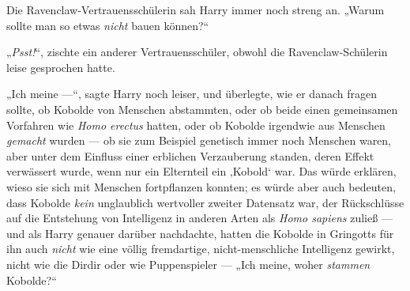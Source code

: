 Die Ravenclaw-Vertrauensschülerin sah Harry immer noch streng an.
„Warum sollte man so etwas \emph{nicht} bauen können?“

„\emph{Psst!}“, zischte ein anderer Vertrauensschüler, obwohl die Ravenclaw-Schülerin leise gesprochen hatte.

„Ich meine —“, sagte Harry noch leiser, und überlegte, wie er danach fragen sollte, ob Kobolde von Menschen abstammten, oder ob beide einen gemeinsamen Vorfahren wie \emph{Homo erectus} hatten, oder ob Kobolde irgendwie aus Menschen \emph{gemacht} wurden — ob sie zum Beispiel genetisch immer noch Menschen waren, aber unter dem Einfluss einer erblichen Verzauberung standen, deren Effekt verwässert wurde, wenn nur ein Elternteil ein ‚Kobold‘ war. Das würde erklären, wieso sie sich mit Menschen fortpflanzen konnten; es würde aber auch bedeuten, dass Kobolde \emph{kein} unglaublich wertvoller zweiter Datensatz war, der Rückschlüsse auf die Entstehung von Intelligenz in anderen Arten als \emph{Homo sapiens} zuließ — und als Harry genauer darüber nachdachte, hatten die Kobolde in Gringotts für ihn auch \emph{nicht} wie eine völlig fremdartige, nicht-menschliche Intelligenz gewirkt, nicht wie die Dirdir oder wie Puppenspieler —
„Ich meine, woher \emph{stammen} Kobolde?“%

